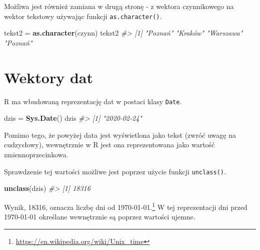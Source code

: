 \documentclass[paper=6in:9in,pagesize=pdftex,headinclude=on,footinclude=on,10pt]{scrbook}
\newenvironment{Shaded}{\begin{snugshade}}{\end{snugshade}}
\newcommand{\CommentTok}[1]{\textcolor[rgb]{0.56,0.35,0.01}{\textit{#1}}}
\newcommand{\KeywordTok}[1]{\textcolor[rgb]{0.13,0.29,0.53}{\textbf{#1}}}
\newcommand{\NormalTok}[1]{#1}
\newcommand{\StringTok}[1]{\textcolor[rgb]{0.31,0.60,0.02}{#1}}
\begin{document}
Możliwa jest również zamiana w drugą stronę - z wektora czynnikowego na wektor tekstowy używając funkcji \texttt{as.character()}.

\begin{Shaded}
\begin{Highlighting}[]
\NormalTok{tekst2 =}\StringTok{ }\KeywordTok{as.character}\NormalTok{(czynn)}
\NormalTok{tekst2}
\CommentTok{#> [1] "Poznań"   "Kraków"   "Warszawa" "Poznań"}
\end{Highlighting}
\end{Shaded}

\hypertarget{ate}{%
\section{Wektory dat}\label{ate}}

R ma wbudowaną reprezentację dat w postaci klasy \texttt{Date}.

\begin{Shaded}
\begin{Highlighting}[]
\NormalTok{dzis =}\StringTok{ }\KeywordTok{Sys.Date}\NormalTok{()}
\NormalTok{dzis}
\CommentTok{#> [1] "2020-02-24"}
\end{Highlighting}
\end{Shaded}

Pomimo tego, że powyżej data jest wyświetlona jako tekst (zwróć uwagę na cudzysłowy), wewnętrznie w R jest ona reprezentowana jako wartość zmiennoprzecinkowa.

\begin{Shaded}
\end{Shaded}

Sprawdzenie tej wartości możliwe jest poprzez użycie funkcji \texttt{unclass()}.

\begin{Shaded}
\begin{Highlighting}[]
\KeywordTok{unclass}\NormalTok{(dzis)}
\CommentTok{#> [1] 18316}
\end{Highlighting}
\end{Shaded}

Wynik, 18316, oznacza liczbę dni od 1970-01-01.\footnote{\url{https://en.wikipedia.org/wiki/Unix_time}}
W tej reprezentacji dni przed 1970-01-01 określane wewnętrznie są poprzez wartości ujemne.
\end{document}
